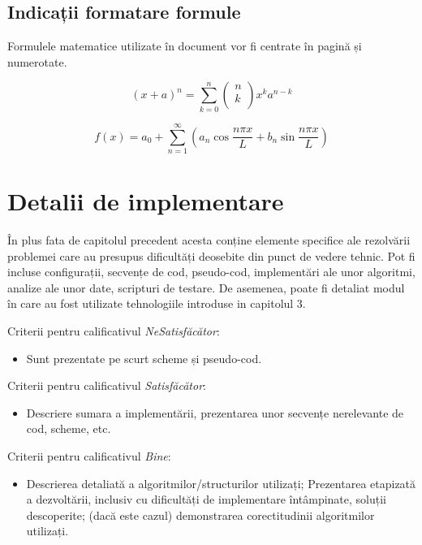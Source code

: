 \documentclass[12pt,a4paper]{report}
\begin{document}
\section{Indicații formatare formule}
Formulele matematice utilizate în document vor fi centrate în pagină și numerotate. 

\begin{equation}
(x+a)^n = \sum_{k=0}^{n}\left(\begin{array}{c}n\\k\\\end{array}\right)x^ka^{n-k}
\end{equation}

\begin{equation}
f(x) = a_0 + \sum_{n=1}^{\infty}\left(a_n \cos\frac{n\pi x}{L} + b_n\sin\frac{n\pi x}{L}\right)
\end{equation}


\chapter{Detalii de implementare}
În plus fata de capitolul precedent acesta conține elemente specifice ale rezolvării problemei care au presupus dificultăți deosebite din punct de vedere tehnic. Pot fi incluse configurații, secvențe de cod, pseudo-cod, implementări ale unor algoritmi, analize ale unor date, scripturi de testare. De asemenea, poate fi detaliat modul în care au fost utilizate tehnologiile introduse in capitolul 3.


Criterii pentru calificativul \textit{Ne\textit{Satisfăcător}}: 
\begin{itemize}
	\item	Sunt prezentate pe scurt scheme și pseudo-cod.
\end{itemize}
Criterii pentru calificativul \textit{Satisfăcător}: 
\begin{itemize}
	\item	Descriere sumara a implementării, prezentarea unor secvențe nerelevante de cod, scheme, etc. 
\end{itemize}
Criterii pentru calificativul \textit{Bine}: 
\begin{itemize}
	\item	Descrierea detaliată a algoritmilor/structurilor utilizați; Prezentarea etapizată a dezvoltării, inclusiv cu dificultăți de implementare întâmpinate, soluții descoperite; (dacă este cazul) demonstrarea corectitudinii algoritmilor utilizați. 
\end{itemize}
\end{document}
